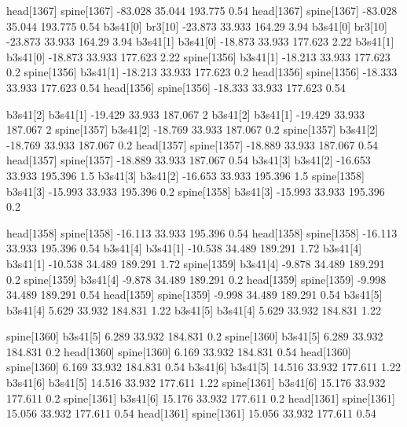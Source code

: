 head[1367]    spine[1367]    -83.028    35.044    193.775    0.54
head[1367]    spine[1367]    -83.028    35.044    193.775    0.54
b3s41[0]    br3[10]    -23.873    33.933    164.29    3.94
b3s41[0]    br3[10]    -23.873    33.933    164.29    3.94
b3s41[1]    b3s41[0]    -18.873    33.933    177.623    2.22
b3s41[1]    b3s41[0]    -18.873    33.933    177.623    2.22
spine[1356]    b3s41[1]    -18.213    33.933    177.623    0.2
spine[1356]    b3s41[1]    -18.213    33.933    177.623    0.2
head[1356]    spine[1356]    -18.333    33.933    177.623    0.54
head[1356]    spine[1356]    -18.333    33.933    177.623    0.54


b3s41[2]    b3s41[1]    -19.429    33.933    187.067    2
b3s41[2]    b3s41[1]    -19.429    33.933    187.067    2
spine[1357]    b3s41[2]    -18.769    33.933    187.067    0.2
spine[1357]    b3s41[2]    -18.769    33.933    187.067    0.2
head[1357]    spine[1357]    -18.889    33.933    187.067    0.54
head[1357]    spine[1357]    -18.889    33.933    187.067    0.54
b3s41[3]    b3s41[2]    -16.653    33.933    195.396    1.5
b3s41[3]    b3s41[2]    -16.653    33.933    195.396    1.5
spine[1358]    b3s41[3]    -15.993    33.933    195.396    0.2
spine[1358]    b3s41[3]    -15.993    33.933    195.396    0.2


head[1358]    spine[1358]    -16.113    33.933    195.396    0.54
head[1358]    spine[1358]    -16.113    33.933    195.396    0.54
b3s41[4]    b3s41[1]    -10.538    34.489    189.291    1.72
b3s41[4]    b3s41[1]    -10.538    34.489    189.291    1.72
spine[1359]    b3s41[4]    -9.878    34.489    189.291    0.2
spine[1359]    b3s41[4]    -9.878    34.489    189.291    0.2
head[1359]    spine[1359]    -9.998    34.489    189.291    0.54
head[1359]    spine[1359]    -9.998    34.489    189.291    0.54
b3s41[5]    b3s41[4]    5.629    33.932    184.831    1.22
b3s41[5]    b3s41[4]    5.629    33.932    184.831    1.22


spine[1360]    b3s41[5]    6.289    33.932    184.831    0.2
spine[1360]    b3s41[5]    6.289    33.932    184.831    0.2
head[1360]    spine[1360]    6.169    33.932    184.831    0.54
head[1360]    spine[1360]    6.169    33.932    184.831    0.54
b3s41[6]    b3s41[5]    14.516    33.932    177.611    1.22
b3s41[6]    b3s41[5]    14.516    33.932    177.611    1.22
spine[1361]    b3s41[6]    15.176    33.932    177.611    0.2
spine[1361]    b3s41[6]    15.176    33.932    177.611    0.2
head[1361]    spine[1361]    15.056    33.932    177.611    0.54
head[1361]    spine[1361]    15.056    33.932    177.611    0.54


